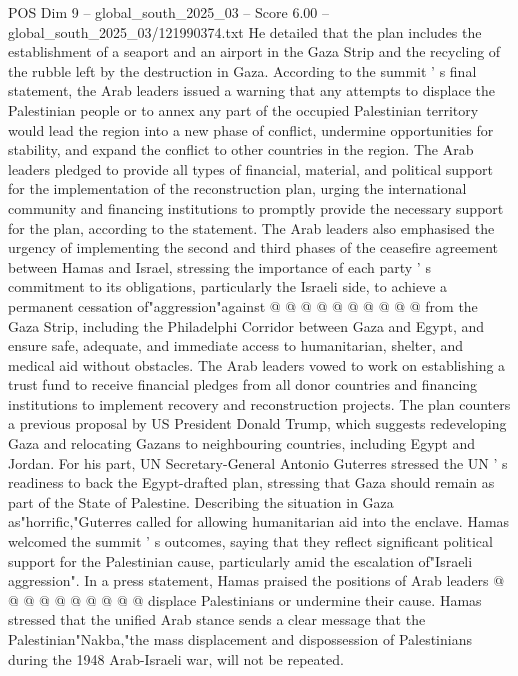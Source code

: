 \begin{textsample}{POS Dim 9 – global\_south\_2025\_03 – Score 6.00 – global\_south\_2025\_03/121990374.txt}  \label{ex:f9_pos_136}
He detailed that the plan includes the establishment of a seaport and an airport in the Gaza Strip and the recycling of the rubble left by the destruction in Gaza.
According to the summit ' s final statement, the Arab leaders issued a warning that any attempts to displace the Palestinian people or to annex any part of the occupied Palestinian territory would lead the region into a new phase of conflict, undermine opportunities for stability, and expand the conflict to other countries in the region.
The Arab leaders pledged to provide all types of financial, material, and political support for the implementation of the reconstruction plan, urging the international community and financing institutions to promptly provide the necessary support for the plan, according to the statement.
The Arab leaders also emphasised the urgency of implementing the second and third phases of the ceasefire agreement between Hamas and Israel, stressing the importance of each party ' s commitment to its obligations, particularly the Israeli side, to achieve a permanent cessation of"aggression"against @ @ @ @ @ @ @ @ @ @ from the Gaza Strip, including the Philadelphi Corridor between Gaza and Egypt, and ensure safe, adequate, and immediate access to humanitarian, shelter, and medical aid without obstacles.
The Arab leaders vowed to work on establishing a trust fund to receive financial pledges from all donor countries and financing institutions to implement recovery and reconstruction projects.
The plan counters a previous proposal by US President Donald Trump, which suggests redeveloping Gaza and relocating Gazans to neighbouring countries, including Egypt and Jordan.
For his part, UN Secretary-General Antonio Guterres stressed the UN ' s readiness to back the Egypt-drafted plan, stressing that Gaza should remain as part of the State of Palestine.
Describing the situation in Gaza as"horrific,"Guterres called for allowing humanitarian aid into the enclave.
Hamas welcomed the summit ' s outcomes, saying that they reflect significant political support for the Palestinian cause, particularly amid the escalation of"Israeli aggression".
In a press statement, Hamas praised the positions of Arab leaders @ @ @ @ @ @ @ @ @ @ displace Palestinians or undermine their cause.
Hamas stressed that the unified Arab stance sends a clear message that the Palestinian"Nakba,"the mass displacement and dispossession of Palestinians during the 1948 Arab-Israeli war, will not be repeated.

\end{textsample}
